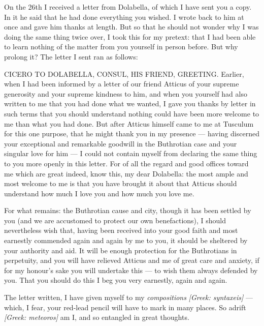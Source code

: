 

 On the 26th I received a letter from Dolabella, of which I have sent you a copy. In it he said that he had done everything you wished. I wrote back to him at once and gave him thanks at length. But so that he should not wonder why I was doing the same thing twice over, I took this for my pretext: that I had been able to learn nothing of the matter from you yourself in person before. But why prolong it? The letter I sent ran as follows:

 CICERO TO DOLABELLA, CONSUL, HIS FRIEND, GREETING. Earlier, when I had been informed by a letter of our friend Atticus of your supreme generosity and your supreme kindness to him, and when you yourself had also written to me that you had done what we wanted, I gave you thanks by letter in such terms that you should understand nothing could have been more welcome to me than what you had done. But after Atticus himself came to me at Tusculum for this one purpose, that he might thank you in my presence --- having discerned your exceptional and remarkable goodwill in the Buthrotian case and your singular love for him --- I could not contain myself from declaring the same thing to you more openly in this letter. For of all the regard and good offices toward me which are great indeed, know this, my dear Dolabella: the most ample and most welcome to me is that you have brought it about that Atticus should understand how much I love you and how much you love me.

 For what remains: the Buthrotian cause and city, though it has been settled by you (and we are accustomed to protect our own benefactions), I should nevertheless wish that, having been received into your good faith and most earnestly commended again and again by me to you, it should be sheltered by your authority and aid. It will be enough protection for the Buthrotians in perpetuity, and you will have relieved Atticus and me of great care and anxiety, if for my honour's sake you will undertake this --- to wish them always defended by you. That you should do this I beg you very earnestly, again and again.

 The letter written, I have given myself to my \textit{compositions} \textit{[Greek: syntaxeis]} --- which, I fear, your red-lead pencil will have to mark in many places. So adrift \textit{[Greek: meteoros]} am I, and so entangled in great thoughts.
